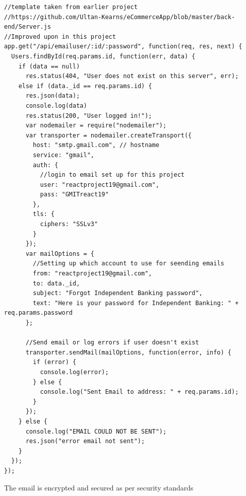 \begin{verbatim}
//template taken from earlier project
//https://github.com/Ultan-Kearns/eCommerceApp/blob/master/back-end/Server.js
//Improved upon in this project
app.get("/api/emailuser/:id/:password", function(req, res, next) {
  Users.findById(req.params.id, function(err, data) {
    if (data == null)
      res.status(404, "User does not exist on this server", err);
    else if (data._id == req.params.id) {
      res.json(data);
      console.log(data)
      res.status(200, "User logged in!");
      var nodemailer = require("nodemailer");
      var transporter = nodemailer.createTransport({
        host: "smtp.gmail.com", // hostname
        service: "gmail",
        auth: {
          //login to email set up for this project
          user: "reactproject19@gmail.com",
          pass: "GMITreact19"
        },
        tls: {
          ciphers: "SSLv3"
        }
      });
      var mailOptions = {
        //Setting up which account to use for seending emails
        from: "reactproject19@gmail.com",
        to: data._id,
        subject: "Forgot Independent Banking password",
        text: "Here is your password for Independent Banking: " + req.params.password
      };

      //Send email or log errors if user doesn't exist
      transporter.sendMail(mailOptions, function(error, info) {
        if (error) {
          console.log(error);
        } else {
          console.log("Sent Email to address: " + req.params.id);
        }
      });
    } else {
      console.log("EMAIL COULD NOT BE SENT");
      res.json("error email not sent");
    }
  });
});
\end{verbatim}
The email is encrypted and secured as per security standards
